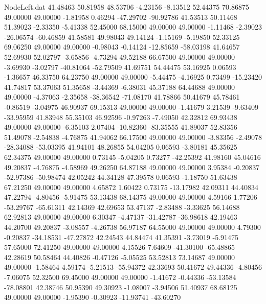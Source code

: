 \begin{filecontents}{NodeLeft.dat}
  41.48463   50.81958   48.53706    -4.23156   -8.13512   52.44375   70.86875   49.00000   49.00000   -1.81958    0.46294  -47.29702  -90.92786
  41.53513   50.11468   51.39023    -2.33350   -5.41338   52.45000   68.15000   49.00000   49.00000   -1.11468   -2.39023  -26.06574  -60.46859
  41.58581   49.98043   49.14124    -1.15169   -5.19850   52.33125   69.06250   49.00000   49.00000   -0.98043   -0.14124  -12.85659  -58.03198
  41.64657   52.69930   52.02797    -3.65856   -4.73294   49.52188   66.67500   49.00000   49.00000   -3.69930   -3.02797  -40.81064  -52.79509
  41.69751   54.44475   53.16925     0.06593   -1.36657   46.33750   64.23750   49.00000   49.00000   -5.44475   -4.16925    0.73499  -15.23420
  41.74817   53.37063   51.35658    -3.44369   -6.38031   45.37188   64.44688   49.00000   49.00000   -4.37063   -2.35658  -38.36542  -71.08170
  41.78866   50.41679   45.78461    -0.86519   -3.04975   46.90937   69.15313   49.00000   49.00000   -1.41679    3.21539   -9.63409  -33.95959
  41.83948   55.35103   46.92596    -0.97263   -7.49050   42.32812   69.93438   49.00000   49.00000   -6.35103    2.07404  -10.82360  -83.35555
  41.89037   52.83356   51.49078    -2.54838   -4.76875   41.94062   66.17500   49.00000   49.00000   -3.83356   -2.49078  -28.34088  -53.03395
  41.94101   48.26855   54.04205     0.06593   -3.80181   45.35625   62.34375   49.00000   49.00000    0.73145   -5.04205    0.73277  -42.25392
  41.98160   45.04616   49.20837    -4.76875   -4.58969   49.26250   64.87188   49.00000   49.00000    3.95384   -0.20837  -52.97386  -50.98474
  42.05242   44.34128   47.39578     0.06593   -1.18750   51.63438   67.21250   49.00000   49.00000    4.65872    1.60422    0.73175  -13.17982
  42.09311   44.40834   47.22794    -4.80456   -5.91475   53.13438   68.14375   49.00000   49.00000    4.59166    1.77206  -53.29767  -65.61311
  42.14369   42.69653   53.47137    -2.83488   -3.33625   56.14688   62.92813   49.00000   49.00000    6.30347   -4.47137  -31.42787  -36.98618
  42.19463   44.20700   49.20837    -3.08557   -4.26738   56.97187   64.55000   49.00000   49.00000    4.79300   -0.20837  -34.18531  -47.27872
  42.24543   44.84474   41.35391    -3.73019   -5.91475   57.65000   72.41250   49.00000   49.00000    4.15526    7.64609  -41.30100  -65.48865
  42.28619   50.58464   44.40826    -0.47126   -5.05525   53.52813   73.14687   49.00000   49.00000   -1.58464    4.59174   -5.21513  -55.94372
  42.33693   50.41672   49.44336    -4.80456   -7.06075   52.32500   69.45000   49.00000   49.00000   -1.41672   -0.44336  -53.13584  -78.08801
  42.38746   50.95390   49.30923    -1.08007   -3.94506   51.40937   68.68125   49.00000   49.00000   -1.95390   -0.30923  -11.93741  -43.60270

\end{filecontents}
